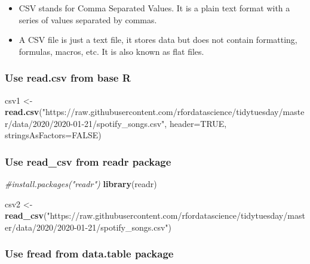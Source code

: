 \documentclass[
]{book}
\newenvironment{Shaded}{\begin{snugshade}}{\end{snugshade}}
\newcommand{\AttributeTok}[1]{\textcolor[rgb]{0.13,0.29,0.53}{#1}}
\newcommand{\CommentTok}[1]{\textcolor[rgb]{0.56,0.35,0.01}{\textit{#1}}}
\newcommand{\ConstantTok}[1]{\textcolor[rgb]{0.56,0.35,0.01}{#1}}
\newcommand{\FunctionTok}[1]{\textcolor[rgb]{0.13,0.29,0.53}{\textbf{#1}}}
\newcommand{\NormalTok}[1]{#1}
\newcommand{\OtherTok}[1]{\textcolor[rgb]{0.56,0.35,0.01}{#1}}
\newcommand{\StringTok}[1]{\textcolor[rgb]{0.31,0.60,0.02}{#1}}
\providecommand{\tightlist}{%
  \setlength{\itemsep}{0pt}\setlength{\parskip}{0pt}}
\begin{document}
\begin{itemize}
\tightlist
\item
  CSV stands for Comma Separated Values. It is a plain text format with a series of values separated by commas.
\item
  A CSV file is just a text file, it stores data but does not contain formatting, formulas, macros, etc. It is also known as flat files.
\end{itemize}

\subsubsection*{Use read.csv from base R}\label{use-read.csv-from-base-r}

\begin{Shaded}
\begin{Highlighting}[]
\NormalTok{csv1 }\OtherTok{\textless{}{-}} \FunctionTok{read.csv}\NormalTok{(}\StringTok{"https://raw.githubusercontent.com/rfordatascience/tidytuesday/master/data/2020/2020{-}01{-}21/spotify\_songs.csv"}\NormalTok{, }\AttributeTok{header=}\ConstantTok{TRUE}\NormalTok{, }\AttributeTok{stringsAsFactors=}\ConstantTok{FALSE}\NormalTok{)}
\end{Highlighting}
\end{Shaded}

\subsubsection*{Use read\_csv from readr package}\label{use-read_csv-from-readr-package}

\begin{Shaded}
\begin{Highlighting}[]
\CommentTok{\#install.packages("readr")}
\FunctionTok{library}\NormalTok{(readr)}

\NormalTok{csv2 }\OtherTok{\textless{}{-}} \FunctionTok{read\_csv}\NormalTok{(}\StringTok{"https://raw.githubusercontent.com/rfordatascience/tidytuesday/master/data/2020/2020{-}01{-}21/spotify\_songs.csv"}\NormalTok{)}
\end{Highlighting}
\end{Shaded}

\subsubsection*{Use fread from data.table package}\label{use-fread-from-data.table-package}
\end{document}
